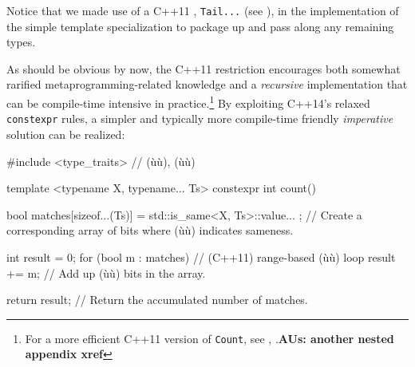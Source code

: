 \noindent Notice that we made use of a C++11 ,
\lstinline!Tail...! (see ), in the
implementation of the simple template specialization to package up and
pass along any remaining types.

As should be obvious by now, the C++11 restriction encourages both
somewhat rarified metaprogramming-related knowledge and a
\emph{recursive} implementation that can be compile-time intensive in
practice.{\cprotect\footnote{For a more efficient C++11 version of
\lstinline!Count!, see , .\textbf{AUs: another nested appendix xref}}} By exploiting C++14's relaxed
\lstinline!constexpr! rules, a simpler and typically more compile-time
friendly \emph{imperative} solution can be realized:

\begin{emcppshiddenlisting}[emcppsbatch=e5]
#include <type_traits>  // (ù{}ù), (ù{}ù)
\end{emcppshiddenlisting}
\begin{emcppslisting}[emcppsbatch=e5,emcppsstandards={c++14}]
template <typename X, typename... Ts>
constexpr int count()
{
    bool matches[sizeof...(Ts)] = { std::is_same<X, Ts>::value... };
        // Create a corresponding array of bits where (ù{}ù) indicates sameness.

    int result = 0;
    for (bool m : matches)  // (C++11) range-based (ù{}ù) loop
    {
        result += m;        // Add up (ù{}ù) bits in the array.
    }

    return result;  // Return the accumulated number of matches.
}
\end{emcppslisting}

